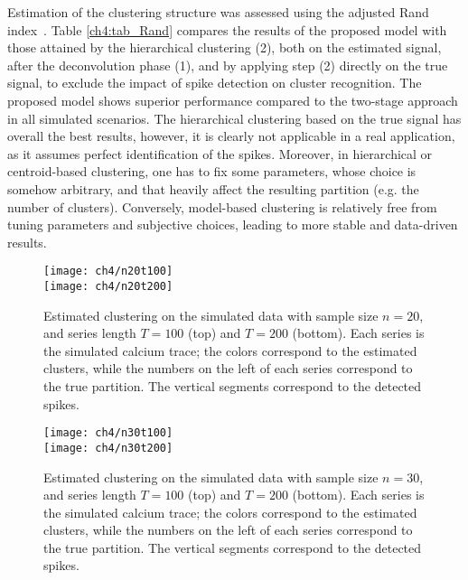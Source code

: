 Estimation of the clustering structure was assessed using the adjusted Rand index~\parencite{rand1971,hubert1985}. Table \ref{ch4:tab_Rand} compares the results of the proposed model with those attained by the hierarchical clustering (2), both on the estimated signal, after the deconvolution phase (1), and by applying step (2) directly on the true signal, to exclude the impact of spike detection on cluster recognition. The proposed model shows superior performance compared to the two-stage approach in all simulated scenarios. The hierarchical clustering based on the true signal has overall the best results, however, it is clearly not applicable in a real application, as it assumes perfect identification of the spikes.
Moreover, in hierarchical or centroid-based clustering, one has to fix some parameters, whose choice is somehow arbitrary, and that heavily affect the resulting partition (e.g. the number of clusters). Conversely, model-based clustering is relatively free from tuning parameters and subjective choices, leading to more stable and data-driven results.

\begin{figure}
	\centering
	\texttt{[image: ch4/n20t100]}\\
	\texttt{[image: ch4/n20t200]}
	\label{ch4:fig_n20}
	\caption[Estimated clustering on the simulated data with sample size $n=20$.]{Estimated clustering on the simulated data with sample size $n=20$, and series length $T=100$ (top) and $T=200$ (bottom). Each series is the simulated calcium trace; the colors correspond to the estimated clusters, while the numbers on the left of each series correspond to the true partition. The vertical segments correspond to the detected spikes.}
\end{figure}

\begin{figure}
	\centering
	\texttt{[image: ch4/n30t100]}\\
	\texttt{[image: ch4/n30t200]}
	\label{ch4:fig_n30}
	\caption[Estimated clustering on the simulated data with sample size $n=30$.]{Estimated clustering on the simulated data with sample size $n=30$, and series length $T=100$ (top) and $T=200$ (bottom). Each series is the simulated calcium trace; the colors correspond to the estimated clusters, while the numbers on the left of each series correspond to the true partition. The vertical segments correspond to the detected spikes.}
\end{figure}

